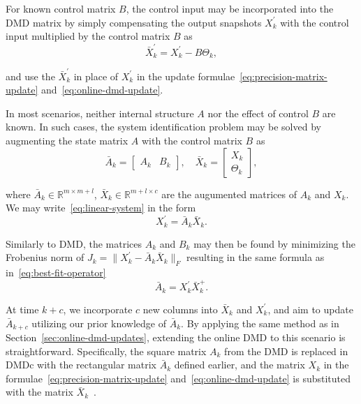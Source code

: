 For known control matrix \(B\), the control input may be incorporated into the DMD matrix by simply compensating the output snapshots \(X^\prime_k\) with the control input multiplied by the control matrix \(B\) as
\begin{equation}\label{eq:control-compensation}
    \bar{X}^\prime_k = X^\prime_k - B \Theta_k,
\end{equation}

and use the \(\bar{X}^\prime_k\) in place of \(X^\prime_k\) in the update formulae~\eqref{eq:precision-matrix-update} and~\eqref{eq:online-dmd-update}.

In most scenarios, neither internal structure \(A\) nor the effect of control \(B\) are known. In such cases, the system identification problem may be solved by augmenting the state matrix \(A\) with the control matrix \(B\) as
\begin{equation}\label{eq:augmented-matrix}
    \bar{A}_k = \begin{bmatrix} A_k & B_k \end{bmatrix}, \quad \bar{X}_k = \begin{bmatrix} X_k \\ \Theta_k \end{bmatrix} ,
\end{equation}

where \(\bar{A}_k \in \mathbb{R}^{m \times m + l}\), \(\bar{X}_k \in \mathbb{R}^{m + l \times c}\) are the augumented matrices of \(A_k\) and \(X_k\). We may write~\eqref{eq:linear-system} in the form
\begin{equation*}
    X^\prime_k = \bar{A}_k \bar{X}_k.
\end{equation*}

Similarly to DMD, the matrices \(A_k\) and \(B_k\) may then be found by minimizing the Frobenius norm of \(J_k = \|X^\prime_k - \bar{A}_k \bar{X}_k\|_F\) resulting in the same  formula as in~\eqref{eq:best-fit-operator}
\begin{equation*}
    \bar{A}_k = X^\prime_k \bar{X}_k^+.
\end{equation*}

At time \(k+c\), we incorporate \(c\) new columns into \(\bar{X}_k\) and \(X^\prime_k\), and aim to update \(\bar{A}_{k+c}\) utilizing our prior knowledge of \(\bar{A}_k\). By applying the same method as in Section~\ref{sec:online-dmd-updates}, extending the online DMD to this scenario is straightforward. Specifically, the square matrix \(A_k\) from the DMD is replaced in DMDc with the rectangular matrix \(\bar{A}_k\) defined earlier, and the matrix \(X_k\) in the formulae~\eqref{eq:precision-matrix-update} and~\eqref{eq:online-dmd-update} is substituted with the matrix \(\bar{X}_k\)~\citep{Zhang2019}.


